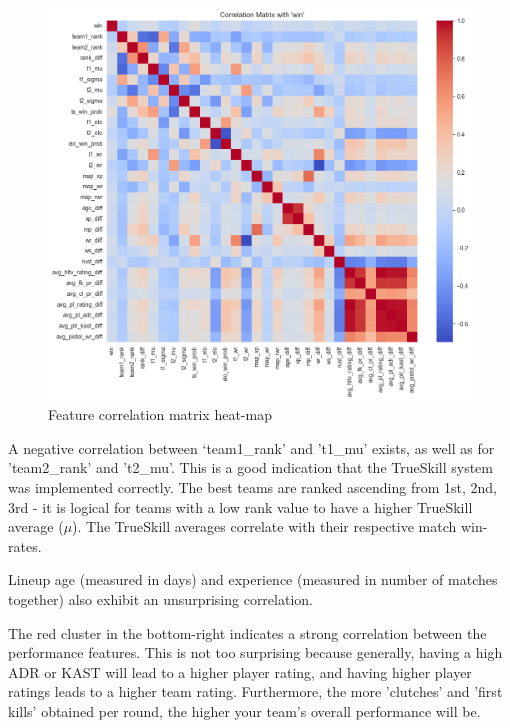 \begin{figure}[h]
	\centering
	\begin{adjustbox}{center} %
		\includegraphics[width=1.3\textwidth]{Figures/corr-plot.png}
	\end{adjustbox}
	\caption{Feature correlation matrix heat-map}
	\label{fig:corr}
\end{figure}

\clearpage

A negative correlation between `team1\_rank' and 't1\_mu' exists, as well as for 'team2\_rank' and 't2\_mu'. This is a good indication that the TrueSkill system was implemented correctly. The best teams are ranked ascending from 1st, 2nd, 3rd - it is logical for teams with a low rank value to have a higher TrueSkill average ($\mu$). The TrueSkill averages correlate with their respective match win-rates.

Lineup age (measured in days) and experience (measured in number of matches together) also exhibit an unsurprising correlation. 

The red cluster in the bottom-right indicates a strong correlation between the  performance features. This is not too surprising because generally, having a high ADR or KAST will lead to a higher player rating, and having higher player ratings leads to a higher team rating. Furthermore, the more 'clutches' and 'first kills' obtained per round, the higher your team's overall performance will be.

